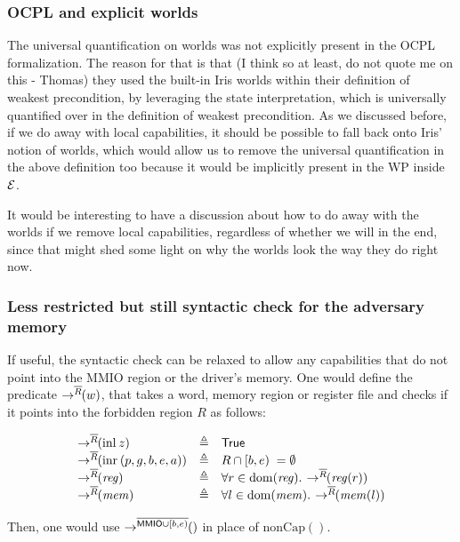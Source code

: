 \documentclass{article}
\newcommand{\X}[1]{\ensuremath{\mathrm{#1}}}
\newcommand{\V}[1]{\ensuremath{\mathit{#1}}}
\newcommand{\Sf}[1]{\ensuremath{\mathsf{#1}}}
\newcommand{\MMIO}{\Sf{MMIO}\xspace}
\newcommand{\nonCap}[1]{\ensuremath{\mathrm{nonCap}(#1)}}
\begin{document}
\subsubsection{OCPL and explicit worlds}
\label{rk:toplevel:ocpl_explicit_worlds}

The universal quantification on worlds was not explicitly present in the OCPL
formalization.
The reason for that is that (I think so at least, do not quote me
on this - Thomas) they
used the built-in Iris worlds within their definition of weakest precondition,
by leveraging the state interpretation, which is universally quantified over in
the definition of weakest precondition.
As we discussed before, if we do away
with local capabilities, it should be possible to fall back onto Iris' notion of
worlds, which would allow us to remove the universal quantification in the
above definition too because it would be implicitly present in the WP inside $\mathcal{E}$.

It would be interesting to have a discussion about how to do away with the
worlds if we remove local capabilities, regardless of whether we will in the
end, since that might shed some light on why the worlds look the way they do
right now.

\subsubsection{Less restricted but still syntactic check for the adversary memory}
\label{rk:toplevel:less_restricted_syntactic_check_adverary}

If useful, the syntactic check can be relaxed to allow any capabilities that
do not point into the MMIO region or the driver's memory. One would define the
predicate $\rightarrow^{\overline{R}}\!\!(w)$, that takes a word, memory region or register
file and checks if it points into the forbidden region $R$ as follows:

\[
  \begin{array}{lcl}
    \notMapsToR{R}{\X{inl}\spac z} & \eqdef
    & \TRUE \\
    \notMapsToR{R}{\X{inr}\spac (p,g,b,e,a)} & \eqdef & R \cap [b,e)\; =
                                                 \emptyset  \\
    \notMapsToR{R}{\V{reg}} & \eqdef & \forall r \in \dom(\V{reg}) \ldotp\spac \notMapsToR{R}{\V{reg}(r)} \\
    \notMapsToR{R}{\V{mem}} & \eqdef & \forall l \in \dom(\V{mem}) \ldotp\spac   \notMapsToR{R}{\V{mem}(l)}
  \end{array}
\]

Then, one would use $\notMapsToR{\MMIO \cup [b,e)}$ in place of $\nonCap{}$.




\end{document}
